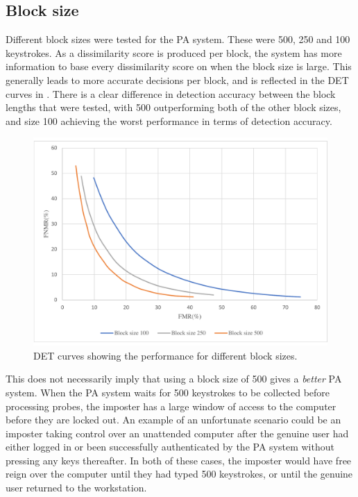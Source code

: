 \subsection{Block size}
\label{sec:analysis-PA-block-size}
Different block sizes were tested for the PA system.
These were 500, 250 and 100 keystrokes.
As a dissimilarity score is produced per block, the system has more information to base every dissimilarity score on when the block size is large.
This generally leads to more accurate decisions per block, and is reflected in the DET curves in .
There is a clear difference in detection accuracy between the block lengths that were tested, with 500 outperforming both of the other block sizes, and size 100 achieving the worst performance in terms of detection accuracy.

\begin{figure}[h]
    \centering
    \includegraphics[width=1\textwidth]{figures/PA-BLs-ROC.pdf}
    \caption{DET curves showing the performance for different block sizes.}
    \label{fig:block-lengths-ROC}
\end{figure}

This does not necessarily imply that using a block size of 500 gives a \textit{better} PA system.
When the PA system waits for 500 keystrokes to be collected before processing probes, the imposter has a large window of access to the computer before they are locked out.
An example of an unfortunate scenario could be an imposter taking control over an unattended computer after the genuine user had either logged in or been successfully authenticated by the PA system without pressing any keys thereafter.
In both of these cases, the imposter would have free reign over the computer until they had typed 500 keystrokes, or until the genuine user returned to the workstation.

